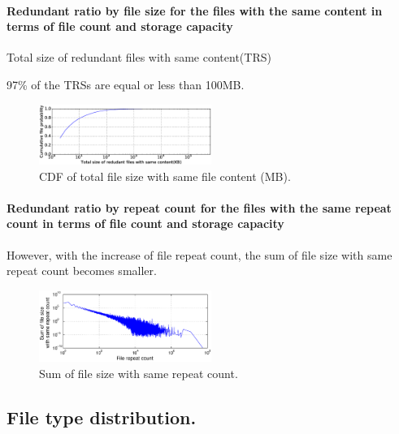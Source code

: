 \paragraph{Redundant ratio by file size for the files with the same content in terms of file count and storage capacity}
Total size of redundant files with same content(TRS)

97\% of the TRSs are equal or less than 100MB.

\begin{figure}
	\centering
	\includegraphics[width=0.5\textwidth]{graphs/Total_size_of_redudant_files_with_same_content-KB.eps}
	\caption{CDF of total file size with same file content (MB).
	}
	\label{fig_total_redundant_same_digest}
\end{figure}

\paragraph{Redundant ratio by repeat count for the files with the same repeat count in terms of file count and storage capacity}

However, with the increase of file repeat count, the sum of file size with same repeat count becomes smaller.

\begin{figure}
	\centering
	\includegraphics[width=0.5\textwidth]{graphs/sum_size_by_cnt.eps}
	\caption{Sum of file size with same repeat count.
	}
	\label{fig_sum_by_cnt}
\end{figure}


\subsection{File type distribution.}

